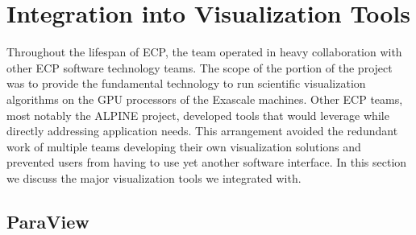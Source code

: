 \section{Integration into Visualization Tools}

Throughout the lifespan of ECP, the \vtkm team operated in heavy collaboration with other ECP software technology teams.
The scope of the \vtkm portion of the project was to provide the fundamental technology to run scientific visualization algorithms on the GPU processors of the Exascale machines.
Other ECP teams, most notably the ALPINE project, developed tools that would leverage \vtkm while directly addressing application needs.
This arrangement avoided the redundant work of multiple teams developing their own visualization solutions and prevented users from having to use yet another software interface.
In this section we discuss the major visualization tools we integrated \vtkm with.


\subsection{ParaView}

